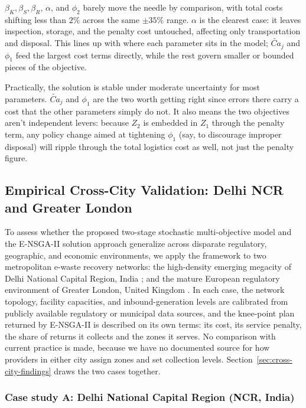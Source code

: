 \documentclass[11pt, a4paper]{article}
\begin{document}
$\beta_K, \beta_S, \beta_R$, $\alpha$, and $\phi_2$ barely move the needle by comparison, with total costs shifting less than $2\%$ across the same $\pm 35\%$ range. $\alpha$ is the clearest case: it leaves inspection, storage, and the penalty cost untouched, affecting only transportation and disposal. This lines up with where each parameter sits in the model; $\widetilde{Ca}_j$ and $\phi_1$ feed the largest cost terms directly, while the rest govern smaller or bounded pieces of the objective.

Practically, the solution is stable under moderate uncertainty for most parameters. $\widetilde{Ca}_j$ and $\phi_1$ are the two worth getting right since errors there carry a cost that the other parameters simply do not. It also means the two objectives aren't independent levers: because $Z_2$ is embedded in $Z_1$ through the penalty term, any policy change aimed at tightening $\phi_1$ (say, to discourage improper disposal) will ripple through the total logistics cost as well, not just the penalty figure. 
\subsection{Empirical Cross-City Validation: Delhi NCR and Greater London}\label{sec:cross-city-validation}

To assess whether the proposed two-stage stochastic multi-objective model and the E-NSGA-II solution approach generalize across disparate regulatory, geographic, and economic environments, we apply the framework to two metropolitan e-waste recovery networks: the high-density emerging megacity of Delhi National Capital Region, India \citep{dpcc2023report}; and the mature European regulatory environment of Greater London, United Kingdom \citep{london_datastore_weee, ea2023weee}. In each case, the network topology, facility capacities, and inbound-generation levels are calibrated from publicly available regulatory or municipal data sources, and the knee-point plan returned by E-NSGA-II is described on its own terms: its cost, its service penalty, the share of returns it collects and the zones it serves. No comparison with current practice is made, because we have no documented source for how providers in either city assign zones and set collection levels. Section~\ref{sec:cross-city-findings} draws the two cases together.

\subsubsection{Case study A: Delhi National Capital Region (NCR, India)}\label{sec:case-delhi}
\end{document}
